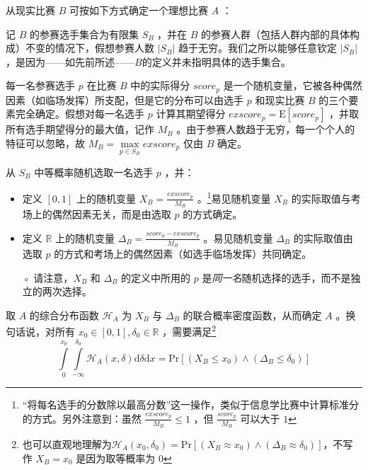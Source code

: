             \begin{definition}
                从现实比赛 $B$ 可按如下方式确定一个理想比赛 $A$ ：

                \begin{asparaenum}[\bfseries{步骤} 1.]
                    \item 记 $B$ 的参赛选手集合为有限集 $S_B$ ，并在 $B$ 的参赛人群（包括人群内部的具体构成）不变的情况下，假想参赛人数 $\left|S_B\right|$ 趋于无穷。我们之所以能够任意钦定 $\left|S_B\right|$ ，是因为——如先前所述——$B$的定义并未指明具体的选手集合。
                    \item \label{step:realToIdealStep2} 每一名参赛选手 $p$ 在比赛 $B$ 中的实际得分 $\textit{score}_p$ 是一个随机变量，它被各种偶然因素（如临场发挥）所支配，但是它的分布可以由选手 $p$ 和现实比赛 $B$ 的三个要素完全确定。假想对每一名选手 $p$ 计算其期望得分 $\textit{exscore}_p=\mathrm{E}\left[\textit{score}_p\right]$ ，并取所有选手期望得分的最大值，记作 $M_B$ 。由于参赛人数趋于无穷，每一个个人的特征可以忽略，故 $M_B=\max\limits_{p\in S_B} \textit{exscore}_p$ 仅由 $B$ 确定。
                    \item \label{step:realToIdealStep3} 从 $S_B$ 中等概率随机选取一名选手 $p$ ，并：
                    \begin{itemize}[leftmargin=4em]
                        \item 定义 $[0,1]$ 上的随机变量 $X_B=\frac{\textit{exscore}_p}{M_B}$ 。\footnote{“将每名选手的分数除以最高分数”这一操作，类似于信息学比赛中计算标准分的方式。另外注意到：虽然 $\frac{\textit{exscore}_p}{M_B}\leq 1$ ，但 $\frac{\textit{score}_p}{M_B}$ 可以大于 $1$ }易见随机变量 $X_B$ 的实际取值与考场上的偶然因素无关，而是由选取 $p$ 的方式确定。
                        \item 定义 $\mathbb{R}$ 上的随机变量 $\Delta_B=\frac{\textit{score}_p-\textit{exscore}_p}{M_B}$ 。易见随机变量 $\Delta_B$ 的实际取值由选取 $p$ 的方式和考场上的偶然因素（如选手临场发挥）共同确定。
                        \item [◦] 请注意，$X_B$ 和 $\Delta_B$ 的定义中所用的 $p$ 是\emph{同一名}随机选择的选手，而不是独立的两次选择。
                    \end{itemize}
                    \item 取 $A$ 的综合分布函数 $\mathcal{H}_A$ 为 $X_B$ 与 $\Delta_B$ 的联合概率密度函数，从而确定 $A$ 。换句话说，对所有 $x_0\in[0,1],\delta_0\in\mathbb{R}$ ，需要满足\footnote{也可以直观地理解为$\mathcal{H}_A(x_0,\delta_0)=\mathrm{Pr}\left[\left(X_B\approx x_0\right)\land\left(\Delta_B\approx\delta_0\right)\right]$，不写作 $X_B=x_0$ 是因为取等概率为 $0$ }
                    \begin{equation}
                        \int\limits_0^{x_0}\int\limits_{-\infty}^{\delta_0} \mathcal{H}_A(x,\delta)\mathrm{d}\delta\mathrm{d}x=\mathrm{Pr}\left[\left(X_B\leq x_0\right)\land\left(\Delta_B\leq\delta_0\right)\right]
                        \label{formula:definitionOfJointDensityFunction}
                    \end{equation}


\end{asparaenum}
\end{definition}
